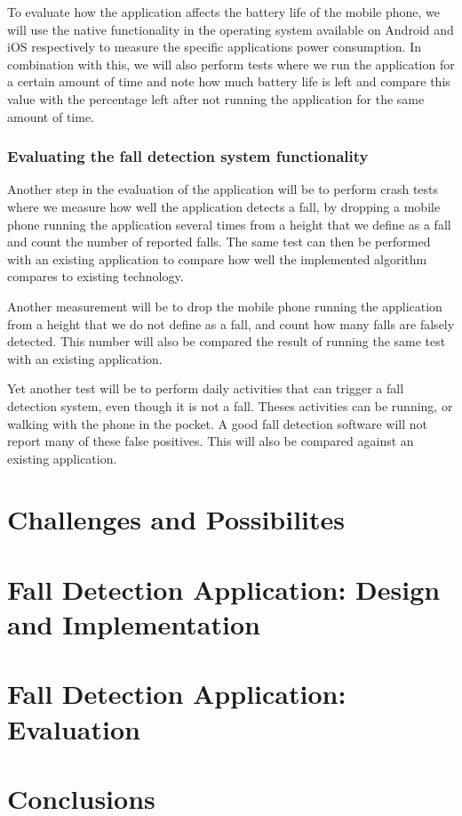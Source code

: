 \documentclass[12pt, a4paper, onecolumn]{article}
\begin{document}
To evaluate how the application affects the battery life of the mobile phone, we will use the native functionality in the operating system available on Android and iOS respectively to measure the specific applications power consumption.
In combination with this, we will also perform tests where we run the application for a certain amount of time and note how much battery life is left and compare this value with the percentage left after not running the application for the same amount of time.

\subsubsection{Evaluating the fall detection system functionality}

Another step in the evaluation of the application will be to perform crash tests where we measure how well the application detects a fall, by dropping a mobile phone running the application several times from a height that we define as a fall and count the number of reported falls. The same test can then be performed with an existing application to compare how well the implemented algorithm compares to existing technology.

Another measurement will be to drop the mobile phone running the application from a height that we do not define as a fall, and count how many falls are falsely detected. This number will also be compared the result of running the same test with an existing application.

Yet another test will be to perform daily activities that can trigger a fall detection system, even though it is not a fall. Theses activities can be running, or walking with the phone in the pocket. A good fall detection software will not report many of these false positives. This will also be compared against an existing application.
	
	\newpage
	
	\section{Challenges and Possibilites}
	\newpage
	
	\section{Fall Detection Application: Design and Implementation}
	\newpage
	
	\section{Fall Detection Application: Evaluation}
	\newpage
	
	\section{Conclusions}
	\newpage
		
	
	
\end{document}
